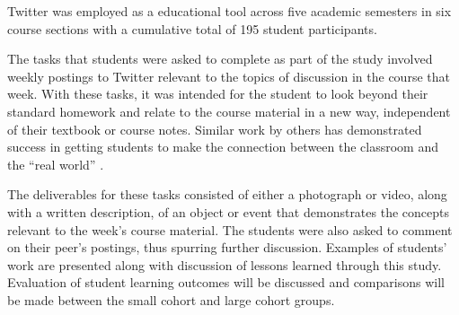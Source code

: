 \documentclass[12pt]{article}
\begin{document}
Twitter was employed as a educational tool across five academic semesters in six course sections with a cumulative total of 195 student participants.

The tasks that students were asked to complete as part of the study involved weekly postings to Twitter relevant to the topics of discussion in the course that week. With these tasks, it was intended for the student to look beyond their standard homework and relate to the course material in a new way, independent of their textbook or course notes. Similar work by others has demonstrated success in getting students to make the connection between the classroom and the “real world” \cite{hopp_journal_2008}.

The deliverables for these tasks consisted of either a photograph or video, along with a written description, of an object or event that demonstrates the concepts relevant to the week’s course material. The students were also asked to comment on their peer's postings, thus spurring further discussion. Examples of students’ work are presented along with discussion of lessons learned through this study. Evaluation of student learning outcomes will be discussed and comparisons will be made between the small cohort and large cohort groups.

\vspace{4\baselineskip}\vspace{-\parskip} %
\footnotesize %


\end{document}
